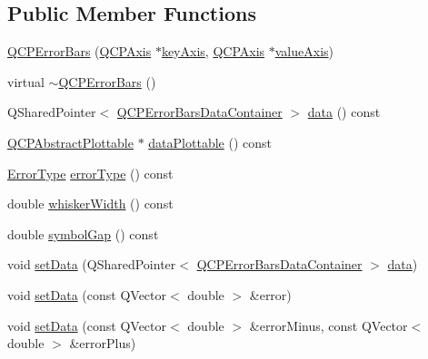 \subsection*{Public Member Functions}
\begin{DoxyCompactItemize}
\item 
\mbox{\hyperlink{class_q_c_p_error_bars_a5cdcc33e5f173780c3d657e96216e5c1}{Q\+C\+P\+Error\+Bars}} (\mbox{\hyperlink{class_q_c_p_axis}{Q\+C\+P\+Axis}} $\ast$\mbox{\hyperlink{class_q_c_p_abstract_plottable_a2cdd6f0dd5e9a979037f86b4000d9cfe}{key\+Axis}}, \mbox{\hyperlink{class_q_c_p_axis}{Q\+C\+P\+Axis}} $\ast$\mbox{\hyperlink{class_q_c_p_abstract_plottable_af47809a644a68ffd955fb30b01fb4f2f}{value\+Axis}})
\item 
virtual \mbox{\hyperlink{class_q_c_p_error_bars_a7468f8c3dc1cb162d86cf392e938a2e3}{$\sim$\+Q\+C\+P\+Error\+Bars}} ()
\item 
Q\+Shared\+Pointer$<$ \mbox{\hyperlink{qcustomplot_8h_a8c4472a4da738e0ddbf6b03222c39906}{Q\+C\+P\+Error\+Bars\+Data\+Container}} $>$ \mbox{\hyperlink{class_q_c_p_error_bars_aeebd1b14f4c3573565efafd514988813}{data}} () const
\item 
\mbox{\hyperlink{class_q_c_p_abstract_plottable}{Q\+C\+P\+Abstract\+Plottable}} $\ast$ \mbox{\hyperlink{class_q_c_p_error_bars_ad7e5f1229db58d05bb3d8305d2504af8}{data\+Plottable}} () const
\item 
\mbox{\hyperlink{class_q_c_p_error_bars_a95f0220f11a72648b96480a85ce26474}{Error\+Type}} \mbox{\hyperlink{class_q_c_p_error_bars_a527e7df83c98709cef22a8447fee4f13}{error\+Type}} () const
\item 
double \mbox{\hyperlink{class_q_c_p_error_bars_ae5a292470366ec92b248753f83b8646e}{whisker\+Width}} () const
\item 
double \mbox{\hyperlink{class_q_c_p_error_bars_a2c969749fa0db565a42b80db9da5f388}{symbol\+Gap}} () const
\item 
void \mbox{\hyperlink{class_q_c_p_error_bars_a92b1980003255f5f7c05407a4d92aabc}{set\+Data}} (Q\+Shared\+Pointer$<$ \mbox{\hyperlink{qcustomplot_8h_a8c4472a4da738e0ddbf6b03222c39906}{Q\+C\+P\+Error\+Bars\+Data\+Container}} $>$ \mbox{\hyperlink{class_q_c_p_error_bars_aeebd1b14f4c3573565efafd514988813}{data}})
\item 
void \mbox{\hyperlink{class_q_c_p_error_bars_a2f33d68a7ec163b09017dce3d9d3abcc}{set\+Data}} (const Q\+Vector$<$ double $>$ \&error)
\item 
void \mbox{\hyperlink{class_q_c_p_error_bars_aac0cf070b957c11177e91b02bcb433c8}{set\+Data}} (const Q\+Vector$<$ double $>$ \&error\+Minus, const Q\+Vector$<$ double $>$ \&error\+Plus)

\end{DoxyCompactItemize}
